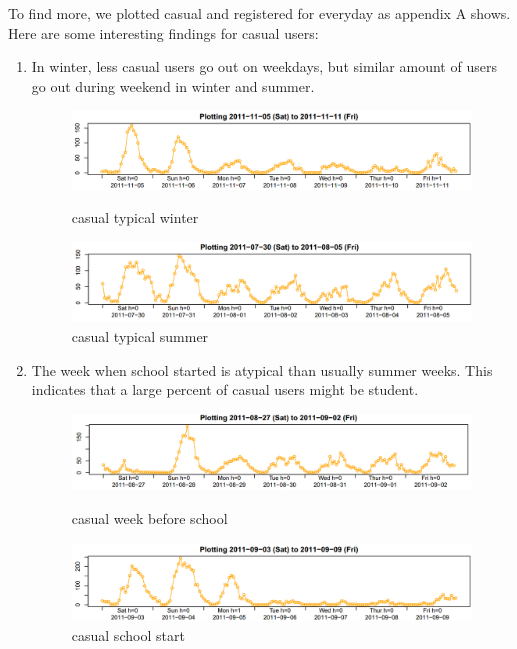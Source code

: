 \documentclass[12pt]{article}
\begin{document}
	To find more, we plotted casual and registered for everyday as appendix A shows. Here are some interesting findings for casual users:
	\begin{enumerate}
		\item In winter, less casual users go out on weekdays, but similar amount of users go out during weekend in winter and summer.
	
		 \begin{figure}[H]
		 	\centering
		 	\begin{minipage}{.5\textwidth}
		 		\centering
		 		\includegraphics[width=\linewidth]{figures/casual_typical_winter.png}
		 		\caption{casual typical winter}
		 	\end{minipage}%
		 	\begin{minipage}{.5\textwidth}
		 		\centering
		 		\includegraphics[width=\linewidth]{figures/casual_typical_summer.png}
		 		\caption{casual typical summer}
		 	\end{minipage}
		 \end{figure}
	 \item The week when school started is atypical than usually summer weeks. This indicates that a large percent of casual users might be student.
	 
	 	 \begin{figure}[H]
	 	 	\centering
	 	 	\begin{minipage}{.5\textwidth}
	 	 		\centering
	 	 		\includegraphics[width=\linewidth]{figures/casual_week_before_school.png}
	 	 		\caption{casual week before school}
	 	 	\end{minipage}%
	 	 	\begin{minipage}{.5\textwidth}
	 	 		\centering
	 	 		\includegraphics[width=\linewidth]{figures/casual_school_start.png}
	 	 		\caption{casual school start}
	 	 	\end{minipage}
	 	 \end{figure}


\end{enumerate}
\end{document}
